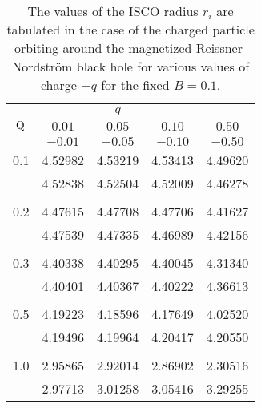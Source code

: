 \documentclass[showpacs,twocolumn,superscriptaddress]{revtex4}
\begin{document}
%
%
\begin{table}[h]
\caption{\label{2tab} The values of the ISCO radius $r_{i}$ are tabulated in the case of the charged particle orbiting around the magnetized Reissner-Nordstr\"{o}m black hole for various values of charge $\pm q$ for the fixed $B=0.1$.  }
\begin{ruledtabular}
\begin{tabular}{c|cccc}
 &  &  $q$ &  &   \\ \hline
{$\rm Q $}  & $0.01$ &  $0.05$
& $0.10$ & $0.50$  \\
%
     & $-0.01$ &  $-0.05$ & $-0.10$ & $-0.50$  \\
\hline
%
%
0.1    &4.52982  &4.53219  &4.53413 &4.49620   \\
%
       &4.52838  &4.52504  &4.52009  &4.46278  \\\\
%
%
0.2    &4.47615 &4.47708  &4.47706 &4.41627  \\
%
       &4.47539 &4.47335 &4.46989  &4.42156  \\\\
%
%
0.3    &4.40338 &4.40295 &4.40045 &4.31340  \\
%
       &4.40401 &4.40367 &4.40222 &4.36613  \\ \\
%
%
0.5    &4.19223 &4.18596 &4.17649 &4.02520  \\
%
       &4.19496 &4.19964 &4.20417 &4.20550  \\ \\
%
%
1.0    &2.95865 &2.92014 &2.86902 &2.30516  \\
%
       &2.97713 &3.01258 &3.05416 &3.29255  \\
%
%      
\end{tabular}
\end{ruledtabular}
\end{table}
%
\end{document}
